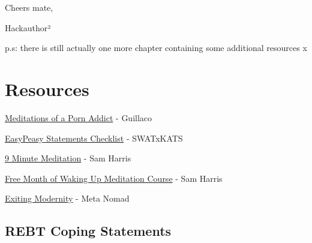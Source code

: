 \documentclass[
]{book}
\begin{document}
Cheers mate,

Hackauthor²

p.s: there is still actually one more chapter containing some additional resources x

\hypertarget{resources}{%
\chapter*{Resources}\label{resources}}

\href{https://mega.nz/file/DlxiFACJ\#FLglnhxnenKVIDn9JVQHI1v_ZGs1yzC3Kvc0mLf13ds}{Meditations of a Porn Addict} - Guillaco

\href{https://pastebin.com/dybv6qkD}{EasyPeasy Statements Checklist} - SWATxKATS

\href{https://www.youtube.com/watch?v=tw7XBKhZJh4}{9 Minute Meditation} - Sam Harris

\href{https://share.wakingup.com/a13290}{Free Month of Waking Up Meditation Course} - Sam Harris

\href{https://meta-nomad.net/exiting-modernity}{Exiting Modernity} - Meta Nomad

\hypertarget{rebt-coping-statements}{%
\section*{REBT Coping Statements}\label{rebt-coping-statements}}
\end{document}
